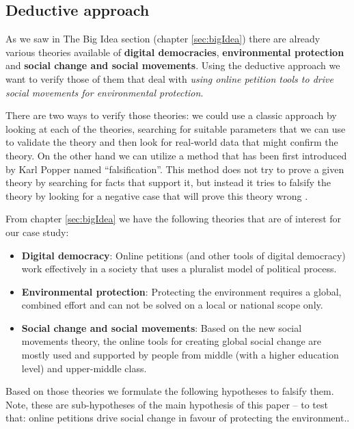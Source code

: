 \subsection{Deductive approach}
As we saw in The Big Idea section (chapter \ref{sec:bigIdea}) there are already various theories available of \textbf{digital democracies}, \textbf{environmental protection} and \textbf{social change and social movements}. Using the deductive approach we want to verify those of them that deal with \textit{using online petition tools to drive social movements for environmental protection}.\par\vspace{0.2cm}

There are two ways to verify those theories: we could use a classic approach by looking at each of the theories, searching for suitable parameters that we can use to validate the theory and then look for real-world data that might confirm the theory. On the other hand we can utilize a method that has been first introduced by Karl Popper named ``falsification''. This method does not try to prove a given theory by searching for facts that support it, but instead it tries to falsify the theory by looking for a negative case that will prove this theory wrong \citep[pg. 797]{Plummer11}.\par\vspace{0.2cm}
From chapter \ref{sec:bigIdea} we have the following theories that are of interest for our case study:
\begin{itemize}
    \item \textbf{Digital democracy}: Online petitions (and other tools of digital democracy) work effectively in a society that uses a pluralist model of political process.
    \item \textbf{Environmental protection}: Protecting the environment requires a global, combined effort and can not be solved on a local or national scope only. 
    \item \textbf{Social change and social movements}: Based on the new social movements theory, the online tools for creating global social change are mostly used and supported by people from middle (with a higher education level) and upper-middle class.
\end{itemize}

Based on those theories we formulate the following hypotheses to falsify them. Note, these are sub-hypotheses of the main hypothesis of this paper -- to test that: online petitions drive social change in favour of protecting the environment..

